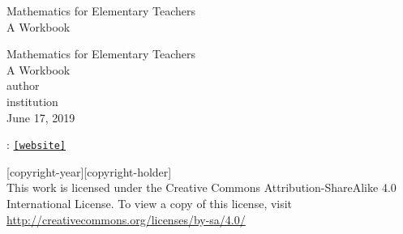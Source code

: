 \documentclass[twoside,11pt,]{book}
\newcommand{\mono}[1]{\texttt{#1}}
\begin{document}
\frontmatter
\thispagestyle{empty}
{\centering
\vspace*{0.28\textheight}
{\Huge Mathematics for Elementary Teachers}\\[2\baselineskip]
{\LARGE A Workbook}\\
}
\clearpage
\thispagestyle{empty}
\null%
\clearpage
\thispagestyle{empty}
{\centering
\vspace*{0.14\textheight}
{\Huge Mathematics for Elementary Teachers}\\[\baselineskip]
{\LARGE A Workbook}\\[3\baselineskip]
{\Large \textbraceleft{}author\textbraceright{}}\\[0.5\baselineskip]
{\Large \textbraceleft{}institution\textbraceright{}}\\[3\baselineskip]
{\Large June 17, 2019}\\}
\clearpage
\thispagestyle{empty}
\hypertarget{colophon-411523609536}{}
: \href{[website]}{\mono{[website]}}\par\medskip
\noindent\textcopyright{}[copyright-year]\quad{}[copyright-holder]\\[0.5\baselineskip]
 This work is licensed under the Creative Commons Attribution-ShareAlike 4.0 International License. To view a copy of this license, visit \href{http://creativecommons.org/licenses/by-sa/4.0/}{http:\slash{}\slash{}creativecommons.org\slash{}licenses\slash{}by-sa\slash{}4.0\slash{}}\par\medskip
{}
\null\clearpage
\setcounter{tocdepth}{2}
\renewcommand*\contentsname{Contents}
\tableofcontents
\mainmatter
%
%
\typeout{************************************************}
\typeout{************************************************}
%
\end{document}
